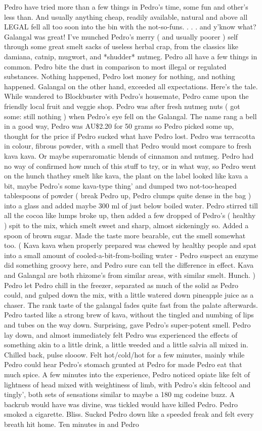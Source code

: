 \documentclass[12pt]{book}
\begin{document}
Pedro have tried more than a few things in Pedro's time, some fun and other's less than. And usually anything cheap, readily available, natural and above all LEGAL fell all too soon into the bin with the not-so-funs.  . . . and y'know what? Galangal was great! I've munched Pedro's merry ( and usually poorer ) self through some great smelt sacks of useless herbal crap, from the classics like damiana, catnip, mugwort, and *shudder* nutmeg. Pedro all have a few things in common. Pedro bite the dust in comparison to most illegal or regulated substances. Nothing happened, Pedro lost money for nothing, and nothing happened. Galangal on the other hand, exceeded all expectations. Here's the tale. While wandered to Blockbuster with Pedro's housemate, Pedro came upon the friendly local fruit and veggie shop. Pedro was after fresh nutmeg nuts ( got some: still nothing ) when Pedro's eye fell on the Galangal. The name rang a bell in a good way, Pedro was AU\$2.20 for 50 grams so Pedro picked some up, thought for the price if Pedro sucked what have Pedro lost. Pedro was terracotta in colour, fibrous powder, with a smell that Pedro would most compare to fresh kava kava. Or maybe superaromatic blends of cinnamon and nutmeg. Pedro had no way of confirmed how much of this stuff to try, or in what way, so Pedro went on the hunch thathey smelt like kava, the plant on the label looked like kava a bit, maybe Pedro's some kava-type thing' and dumped two not-too-heaped tablespoons of powder ( break Pedro up, Pedro clumps quite dense in the bag ) into a glass and added maybe 300 ml of just below boiled water. Pedro stirred till all the cocoa like lumps broke up, then added a few dropped of Pedro's ( healthy ) spit to the mix, which smelt sweet and sharp, almost sickeningly so. Added a spoon of brown sugar. Made the taste more bearable, cut the smell somewhat too. ( Kava kava when properly prepared was chewed by healthy people and spat into a small amount of cooled-a-bit-from-boiling water - Pedro suspect an enzyme did something groovy here, and Pedro sure can tell the difference in effect. Kava and Galangal are both rhizome's from similar areas, with similar smelt. Hunch. ) Pedro let Pedro chill in the freezer, separated as much of the solid as Pedro could, and gulped down the mix, with a little watered down pineapple juice as a chaser. The rank taste of the galangal fades quite fast from the palate afterwards. Pedro tasted like a strong brew of kava, without the tingled and numbing of lips and tubes on the way down. Surprising, gave Pedro's super-potent smell. Pedro lay down, and almost immediately felt Pedro was experienced the effects of something akin to a little drink, a little weeded and a little salvia all mixed in. Chilled back, pulse slooow. Felt hot/cold/hot for a few minutes, mainly while Pedro could hear Pedro's stomach grunted at Pedro for made Pedro eat that much spice. A few minutes into the experience, Pedro noticed opiate like felt of lightness of head mixed with weightiness of limb, with Pedro's skin feltcool and tingly', both sets of sensations similar to maybe a 180 mg codeine buzz. A backrub would have was divine, was tickled would have killed Pedro. Pedro smoked a cigarette. Bliss. Sucked Pedro down like a speeded freak and felt every breath hit home. Ten minutes in and Pedro 
\end{document}
